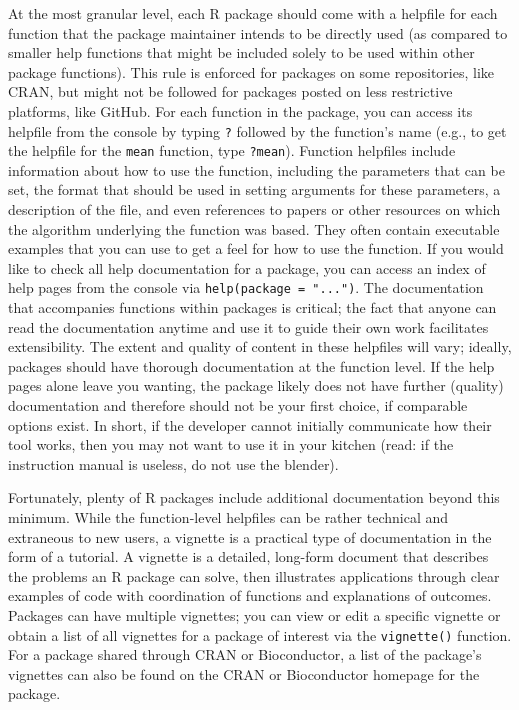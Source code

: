 \documentclass[10pt,letterpaper]{article}
\begin{document}
At the most granular level, each R package should come with a helpfile
for each function that the package maintainer intends to be directly
used (as compared to smaller help functions that might be included
solely to be used within other package functions). This rule is enforced
for packages on some repositories, like CRAN, but might not be followed
for packages posted on less restrictive platforms, like GitHub. For each
function in the package, you can access its helpfile from the console by
typing \texttt{?} followed by the function's name (e.g., to get the
helpfile for the \texttt{mean} function, type \texttt{?mean}). Function
helpfiles include information about how to use the function, including
the parameters that can be set, the format that should be used in
setting arguments for these parameters, a description of the file, and
even references to papers or other resources on which the algorithm
underlying the function was based. They often contain executable
examples that you can use to get a feel for how to use the function. If
you would like to check all help documentation for a package, you can
access an index of help pages from the console via
\texttt{help(package\ =\ "...")}. The documentation that accompanies
functions within packages is critical; the fact that anyone can read the
documentation anytime and use it to guide their own work facilitates
extensibility. The extent and quality of content in these helpfiles will
vary; ideally, packages should have thorough documentation at the
function level. If the help pages alone leave you wanting, the package
likely does not have further (quality) documentation and therefore
should not be your first choice, if comparable options exist. In short,
if the developer cannot initially communicate how their tool works, then
you may not want to use it in your kitchen (read: if the instruction
manual is useless, do not use the blender).

Fortunately, plenty of R packages include additional documentation
beyond this minimum. While the function-level helpfiles can be rather
technical and extraneous to new users, a vignette is a practical type of
documentation in the form of a tutorial. A vignette is a detailed,
long-form document that describes the problems an R package can solve,
then illustrates applications through clear examples of code with
coordination of functions and explanations of outcomes. Packages can
have multiple vignettes; you can view or edit a specific vignette or
obtain a list of all vignettes for a package of interest via the
\texttt{vignette()} function. For a package shared through CRAN or
Bioconductor, a list of the package's vignettes can also be found on the
CRAN or Bioconductor homepage for the package.
\end{document}
